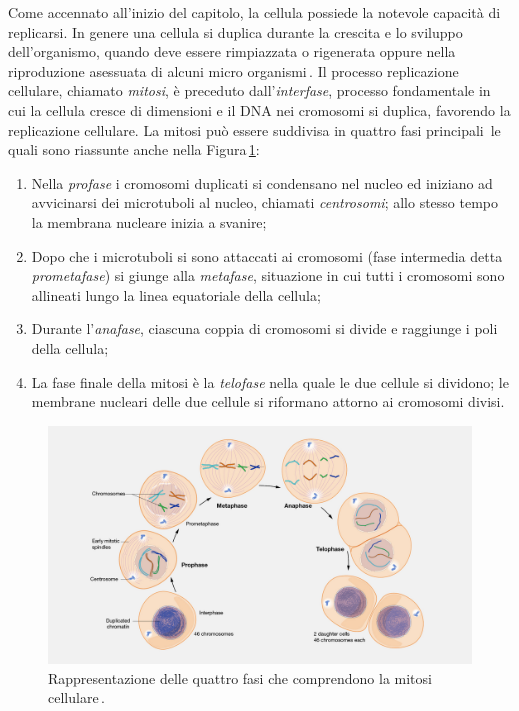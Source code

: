 Come accennato all'inizio del capitolo, la cellula possiede la notevole capacità di replicarsi. In genere una cellula si duplica durante la crescita e lo sviluppo dell'organismo, quando deve essere rimpiazzata o rigenerata oppure nella riproduzione asessuata di alcuni micro organismi\,\cite{bavle2014mitosis}. Il processo replicazione cellulare, chiamato \textsl{mitosi}, è preceduto dall'\textsl{interfase}, processo fondamentale in cui la cellula cresce di dimensioni e il DNA nei cromosomi si duplica, favorendo la replicazione cellulare. La mitosi può essere suddivisa in quattro fasi principali\,\cite{walczak2010mechanisms, bavle2014mitosis, li2020theoretical, sullivan2007finishing} le quali sono riassunte anche nella Figura\,\ref{fig:mitosis}:
\begin{enumerate}
    \item Nella \textsl{profase} i cromosomi duplicati si condensano nel nucleo ed iniziano ad avvicinarsi dei microtuboli al nucleo, chiamati \textsl{centrosomi}; allo stesso tempo la membrana nucleare inizia a svanire;
    \item Dopo che i microtuboli si sono attaccati ai cromosomi (fase intermedia detta \textsl{prometafase}) si giunge alla \textsl{metafase}, situazione in cui tutti i cromosomi sono allineati lungo la linea equatoriale della cellula;
    \item Durante l'\textsl{anafase}, ciascuna coppia di cromosomi si divide e raggiunge i poli della cellula;
    \item La fase finale della mitosi è la \textsl{telofase} nella quale le due cellule si dividono; le membrane nucleari delle due cellule si riformano attorno ai cromosomi divisi.
\end{enumerate}

\begin{figure}[b!]
    \centering
    \includegraphics[width=\textwidth]{assets/mitosis.jpg}
    \caption[La mitosi cellulare.]{Rappresentazione delle quattro fasi che comprendono la mitosi cellulare\,\cite{nhgri_mitosis_image}.}\label{fig:mitosis}
\end{figure}

